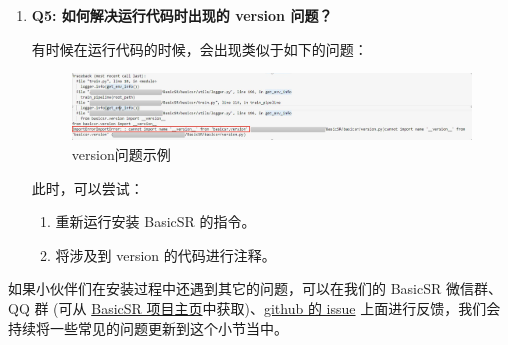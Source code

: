 \documentclass[../main.tex]{subfiles}
\begin{document}
\begin{enumerate}
    \item \textbf{Q5: 如何解决运行代码时出现的 version 问题？}

          有时候在运行代码的时候，会出现类似于如下的问题：
          \begin{figure}[H]
              \begin{center}
                  \includegraphics[width=0.8\linewidth]{figures/installation_version.jpg}
                  \caption{version问题示例}
                  \label{fig:version}
              \end{center}
              \vspace{-0.5cm}
          \end{figure}
          此时，可以尝试：
          \begin{enumerate}
              \item 重新运行安装 BasicSR 的指令。
              \item 将涉及到 version 的代码进行注释。
          \end{enumerate}

\end{enumerate}

\begin{hl}
    如果小伙伴们在安装过程中还遇到其它的问题，可以在我们的 BasicSR 微信群、 QQ 群 (可从 \href{https://github.com/XPixelGroup/BasicSR/blob/master/README_CN.md}{BasicSR 项目主页}中获取)、\href{https://github.com/XPixelGroup/BasicSR/issues}{github 的 issue} 上面进行反馈，我们会持续将一些常见的问题更新到这个小节当中。
\end{hl}
\end{document}
